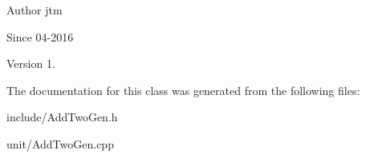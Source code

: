 \begin{DoxyAuthor}{Author}
jtm 
\end{DoxyAuthor}
\begin{DoxySince}{Since}
04-\/2016 
\end{DoxySince}
\begin{DoxyVersion}{Version}
1. 
\end{DoxyVersion}


The documentation for this class was generated from the following files\-:\begin{DoxyCompactItemize}
\item 
include/Add\-Two\-Gen.\-h\item 
unit/Add\-Two\-Gen.\-cpp\end{DoxyCompactItemize}
